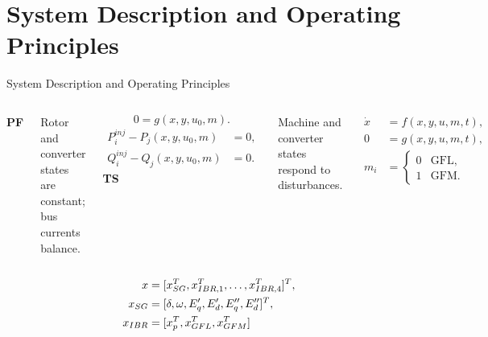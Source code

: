 \documentclass{beamer}
\begin{document}
\section{System Description and Operating Principles}
\begin{frame}{System Description and Operating Principles}
\footnotesize
\begin{columns}[t,onlytextwidth]
\textbf{PF}\par
Rotor and converter states are constant; bus currents balance.\par
\begin{equation}
0=g(x,y,u_0,m).
\end{equation}
{\scriptsize
\begin{align}
P^{inj}_i-P_j(x,y,u_0,m)&=0,\\
Q^{inj}_i-Q_j(x,y,u_0,m)&=0.
\end{align}}
\textbf{TS}\par
Machine and converter states respond to disturbances.\par
\begin{align}
\dot x&=f(x,y,u,m,t),\\
0&=g(x,y,u,m,t),\\
m_i&=\begin{cases}0&\text{GFL},\\1&\text{GFM}.\end{cases}
\end{align}
\end{columns}
\begin{align}
	\centering
	x&=[x_{SG}^{T},x_{IBR,1}^{T},\ldots,x_{IBR,4}^{T}]^T,\\
	x_{SG}&=[\delta,\omega,E_q',E_d',E_q'',E_d'']^T,\\
	x_{IBR}&=[x_{p}^T,x_{GFL}^T,x_{GFM}^T]
\end{align}
\end{frame}
\end{document}
